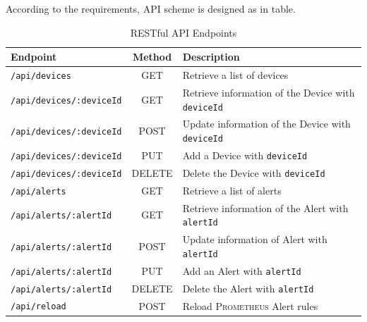 According to the requirements, API scheme is designed as in table.

\begin{table}[h!]
  \centering
  \begin{tabular}{|l|c|l|}
    \hline
    Endpoint                          & Method & Description                                                                                              \\ [0.5ex]
    \hline\hline
    \texttt{\lstinline{/api/devices}} & GET    & Retrieve a list of devices                                                                               \\
    \hline
    \texttt{\lstinline{/api/devices/:deviceId}}    & GET    & Retrieve information of the Device with \texttt{\lstinline{deviceId}}                       \\
    \hline
    \texttt{\lstinline{/api/devices/:deviceId}} & POST   &   Update information of the Device with \texttt{\lstinline{deviceId}}                          \\
    \hline
    \texttt{\lstinline{/api/devices/:deviceId}} & PUT    &    Add a Device with \texttt{\lstinline{deviceId}}                                             \\
    \hline
    \texttt{\lstinline{/api/devices/:deviceId}} & DELETE &    Delete the Device with \texttt{\lstinline{deviceId}}                                        \\
    \hline
    \texttt{\lstinline{/api/alerts}}  & GET    & Retrieve a list of alerts                                                                                \\
    \hline
    \texttt{\lstinline{/api/alerts/:alertId}}    & GET    & Retrieve information of the Alert with \texttt{\lstinline{alertId}}                           \\
    \hline
    \texttt{\lstinline{/api/alerts/:alertId}} & POST   &   Update information of Alert with \texttt{\lstinline{alertId}}                                  \\
    \hline
    \texttt{\lstinline{/api/alerts/:alertId}} & PUT    &    Add an Alert with \texttt{\lstinline{alertId}}                                                \\
    \hline
    \texttt{\lstinline{/api/alerts/:alertId}} & DELETE &    Delete the Alert with \texttt{\lstinline{alertId}}                                            \\
    \hline
    \texttt{\lstinline{/api/reload}} & POST &                                                                      Reload \textsc{Prometheus} Alert rules \\ [1ex]
    \hline
  \end{tabular}
  \caption{\label{table:api}RESTful API Endpoints}
\end{table}


